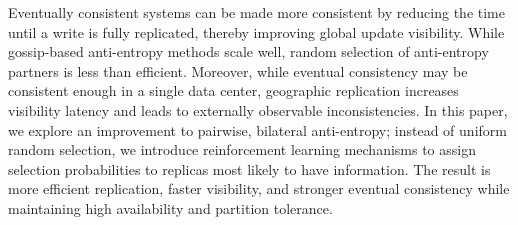 Eventually consistent systems can be made more consistent by reducing the time
until a write is fully replicated, thereby improving global update visibility.
While gossip-based anti-entropy methods scale well, random selection of
anti-entropy partners is less than efficient.
Moreover, while eventual consistency may be consistent enough in a single data
center, geographic replication increases visibility latency and leads to
externally observable inconsistencies.
In this paper, we explore an improvement to pairwise, bilateral anti-entropy;
instead of uniform random selection, we introduce reinforcement learning
mechanisms to assign selection probabilities to replicas most likely to have
information.
The result is more efficient replication, faster visibility, and stronger
eventual consistency while maintaining high availability and partition
tolerance.
